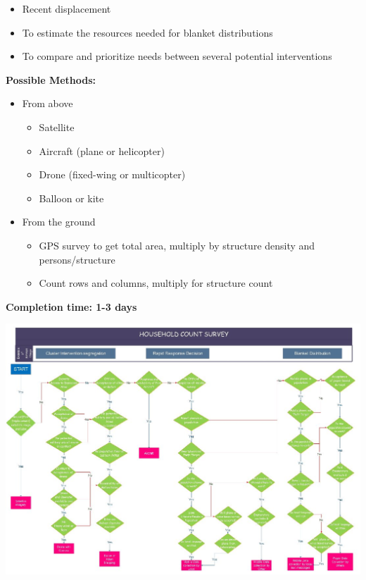 \documentclass[a4paper,12pt,twoside]{article}
\begin{document}
\begin{itemize}
  \item Recent displacement
  \item To estimate the resources needed for blanket distributions
  \item To compare and prioritize needs between several potential interventions
\end{itemize}

\noindent
\textbf{Possible Methods:}

\begin{itemize}
  \item From above
  \begin{itemize}
    \item Satellite
    \item Aircraft (plane or helicopter)
    \item Drone (fixed-wing or multicopter)
    \item Balloon or kite
  \end{itemize}
\end{itemize}

\begin{itemize}
  \item From the ground
  \begin{itemize}
    \item GPS survey to get total area, multiply by structure density and persons/structure
    \item Count rows and columns, multiply for structure count
  \end{itemize}
\end{itemize}

\noindent
\textbf{Completion time: 1-3 days}

\includegraphics[width=1\textwidth]{images/Household_Count.jpeg}
\end{document}
